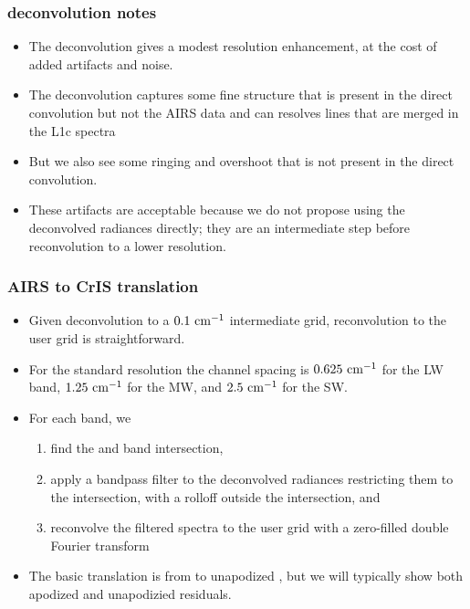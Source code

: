 \documentclass[10pt]{beamer}
\begin{document}
\begin{frame}
\frametitle{deconvolution notes}
\begin{itemize}

  \item The {\airs} deconvolution gives a modest resolution
    enhancement, at the cost of added artifacts and noise.

  \item The deconvolution captures some fine structure that is
    present in the direct convolution but not the AIRS data and 
    can resolves lines that are merged in the {\airs} L1c spectra

  \item But we also see some ringing and overshoot that is not
    present in the direct convolution.

  \item These artifacts are acceptable because we do not propose
    using the deconvolved radiances directly; they are an
    intermediate step before reconvolution to a lower resolution.

\end{itemize}
\end{frame}
\begin{frame}
\frametitle{AIRS to CrIS translation}
\begin{itemize}

  \item Given {\airs} deconvolution to a $0.1~\mbox{cm$^{-1}$}$ intermediate
    grid, reconvolution to the {\cris} user grid is straightforward.

  \item For the {\cris} standard resolution the channel spacing is
    $0.625~\mbox{cm$^{-1}$}$ for the LW band, $1.25~\mbox{cm$^{-1}$}$ for the MW, and
    $2.5~\mbox{cm$^{-1}$}$ for the SW.

  \item For each {\cris} band, we 
    \begin{enumerate}
       \item find the {\airs} and {\cris} band intersection, 
       \item apply a bandpass filter to the deconvolved {\airs}
         radiances restricting them to the intersection, with a
         rolloff outside the intersection, and
       \item reconvolve the filtered spectra to the {\cris} user
         grid with a zero-filled double Fourier transform
    \end{enumerate}

  \item The basic translation is from {\airs} to unapodized {\cris},
    but we will typically show both apodized and unapodizied residuals.

\end{itemize}
\end{frame}
\end{document}
